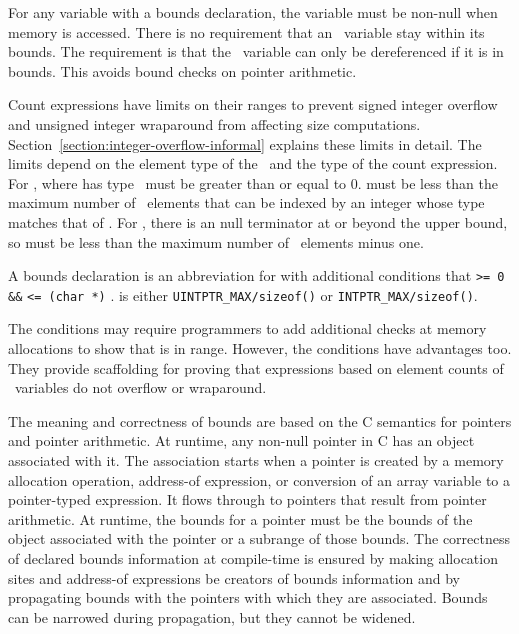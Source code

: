 For any variable with a bounds declaration, the variable must be
non-null when memory is accessed.  There is no requirement that an
\arrayptr\ variable stay within its bounds. The requirement is
that the \arrayptr\ variable can only be dereferenced if it is
in bounds. This avoids bound checks on pointer arithmetic.

Count expressions have limits on their ranges to prevent signed integer
overflow and unsigned integer wraparound from affecting size
computations. Section~\ref{section:integer-overflow-informal}
explains these limits in detail. The limits
depend on the element type of the \arrayptr\ and the type of the count
expression. For , where 
has type \arrayptrT\,
 must be greater than or equal to 0.  must be less
than the maximum number of \arrayptrT\ elements
that can be indexed by an integer whose type matches that of .
For \ntarrayptr, there is
an null terminator at or beyond the upper bound, so 
must be less than the maximum number of \arrayptrT\ elements minus one.

A bounds declaration  is an
abbreviation for  with additional conditions that 
\lstinline|>= 0 &&|  \lstinline|<= (char *)|
.  is either
\lstinline|UINTPTR_MAX/sizeof(|\lstinline|)| or
\lstinline|INTPTR_MAX/sizeof(|\lstinline|)|.

The conditions may require programmers to add additional checks at memory allocations
to show that  is in range. However, the conditions have advantages too.
They provide scaffolding for proving that expressions based on
element counts of \arrayptr\ variables do not overflow or wraparound.

The meaning and correctness of bounds are based on the C semantics for
pointers and pointer arithmetic. At runtime, any non-null pointer in C
has an object associated with it. The association starts when a pointer
is created by a memory allocation operation, address-of expression, or
conversion of an array variable to a pointer-typed expression. It flows
through to pointers that result from pointer arithmetic. At runtime, the
bounds for a pointer must be the bounds of the object associated with
the pointer or a subrange of those bounds. The correctness of declared
bounds information at compile-time is ensured by making allocation sites
and address-of expressions be creators of bounds information and by
propagating bounds with the pointers with which they are associated.
Bounds can be narrowed during propagation, but they cannot be widened.

